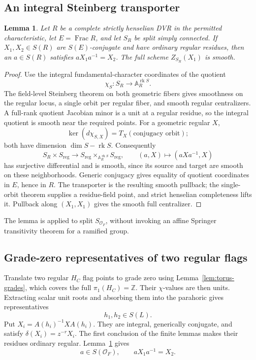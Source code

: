\documentclass[11pt,a4paper]{article}
\newtheorem{lemma}[theorem]{Lemma}
\theoremstyle{definition}
\theoremstyle{remark}
\begin{document}
\subsection{An integral Steinberg transporter}
\begin{lemma}\label{lem:integral-steinberg}
Let \(R\) be a complete strictly henselian DVR in the permitted
characteristic, let \(E=\operatorname{Frac}R\), and let \(S_R\) be
split simply connected. If \(X_1,X_2\in S(R)\) are \(S(E)\)-conjugate
and have ordinary regular residues, then an \(a\in S(R)\) satisfies
\(aX_1a^{-1}=X_2\). The full scheme \(Z_{S_R}(X_1)\) is smooth.
\end{lemma}
\begin{proof}
Use the integral fundamental-character coordinates of the quotient
\[
\chi_S:S_R\longrightarrow\mathbb A_R^{\operatorname{rk}S}.
\]
The field-level Steinberg theorem on both geometric fibers gives
smoothness on the regular locus, a single orbit per regular fiber,
and smooth regular centralizers.
A full-rank quotient Jacobian minor is a unit at a regular residue,
so the integral quotient is smooth near the required points.
For a geometric regular \(X\),
\[
\ker(d\chi_{S,X})=T_X(\text{conjugacy orbit});
\]
both have dimension \(\dim S-\operatorname{rk}S\).
Consequently
\[
S_R\times S_{\mathrm{reg}}\longrightarrow
S_{\mathrm{reg}}\times_{\mathbb A_R^{\operatorname{rk}S}}
S_{\mathrm{reg}},\qquad
(a,X)\longmapsto(aXa^{-1},X)
\]
has surjective differential and is smooth, since its source and
target are smooth on these neighborhoods.
Generic conjugacy gives equality of quotient coordinates in \(E\),
hence in \(R\). The transporter is the resulting smooth pullback;
the single-orbit theorem supplies a residue-field point, and strict
henselian completeness lifts it.
Pullback along \((X_1,X_1)\) gives the smooth full centralizer.
\end{proof}
The lemma is applied to split \(S_{\mathcal O_F}\), without invoking
an affine Springer transitivity theorem for a ramified group.

\subsection{Grade-zero representatives of two regular flags}
Translate two regular \(H_C\) flag points to grade zero using
Lemma~\ref{lem:torus-grades}, which covers the full
\(\pi_1(H_C)=\mathbb Z\).
Their \(\chi\)-values are then units. Extracting scalar unit roots
and absorbing them into the parahoric gives representatives
\[
h_1,h_2\in S(L).
\]
Put \(X_i=A(h_i)^{-1}X A(h_i)\). They are integral, generically
conjugate, and satisfy \(\delta(X_i)=z^{-r}X_i\).
The first conclusion of the finite lemmas makes their residues
ordinary regular. Lemma~\ref{lem:integral-steinberg} gives
\[
a\in S(\mathcal O_F),\qquad aX_1a^{-1}=X_2.
\]
\end{document}
